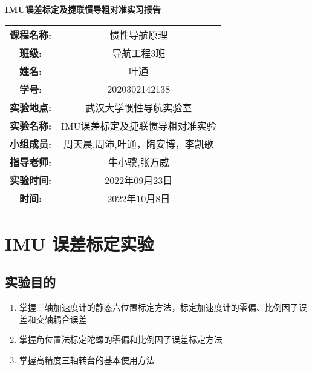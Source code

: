 \documentclass{ctexart}
\begin{document}
\newpage
\thispagestyle{empty}
    \begin{center}
        \Huge\textbf{IMU误差标定及捷联惯导粗对准实习报告}
    \end{center}
\vspace*{\fill}

\begin{table}[h]
    \centering
    \large
    \begin{tabular}{cc}
    \textbf{课程名称:} & 惯性导航原理 \\ \cline{2-2}
    \textbf{班级:} & 导航工程3班 \\ \cline{2-2}
    \textbf{姓名:} & 叶通 \\  \cline{2-2}
    \textbf{学号:} & 2020302142138 \\ \cline{2-2}
    \textbf{实验地点:}&武汉大学惯性导航实验室 \\ \cline{2-2}
    \textbf{实验名称:}&IMU误差标定及捷联惯导粗对准实验\\ \cline{2-2}
    \textbf{小组成员:}&周天晨,周沛,叶通，陶安博，李凯歌\\ \cline{2-2}
    \textbf{指导老师:}&牛小骥,张万威\\ \cline{2-2}
    \textbf{实验时间:}&2022年09月23日\\ \cline{2-2}
    \textbf{时间:} &2022年10月8日 \\ \cline{2-2}
    \end{tabular}
\end{table}

\newpage
{}
\setcounter{page}{1}
\tableofcontents

\newpage
\setcounter{page}{1}

\section{IMU 误差标定实验}
\subsection{实验目的}
\begin{enumerate}[(1)]
\item  掌握三轴加速度计的静态六位置标定方法，标定加速度计的零偏、比例因子误差和交轴耦合误差
\item  掌握角位置法标定陀螺的零偏和比例因子误差标定方法
\item 掌握高精度三轴转台的基本使用方法
\end{enumerate}
\end{document}
